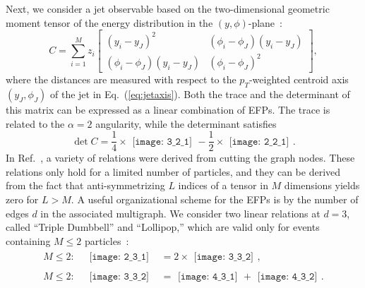 \documentclass[aps,prd,twocolumn, superscriptaddress,preprintnumbers, nofootinbib,longbibliography,floatfix]{revtex4-2}
\DeclareRobustCommand{\Eq}[1]{Eq.~(\ref{#1})}
\DeclareRobustCommand{\Ref}[1]{Ref.~\cite{#1}}
\begin{document}
Next, we consider a jet observable based on the two-dimensional geometric moment tensor of the energy distribution in the $(y,\phi)$-plane~\cite{Gur-Ari:2011cjr,Gallicchio:2012ez}:
%
\begin{equation}
	C = \sum_{i = 1}^M z_i
	\begin{bmatrix}
		(y_i - y_J)^2 & (\phi_i - \phi_J)(y_i - y_J) \\
		(\phi_i - \phi_J)(y_i - y_J) & (\phi_i - \phi_J)^2
	\end{bmatrix},
	\label{eq:C}
\end{equation}
%
where the distances are measured with respect to the $p_T$-weighted centroid axis $(y_J,\phi_J)$ of the jet in \Eq{eq:jetaxis}.
%
Both the trace and the determinant of this matrix can be expressed as a linear combination of EFPs.
%
The trace is related to the $\alpha = 2$ angularity, while the determinant satisfies~\cite{Komiske:2017aww}
%
\begin{equation}
\det C = \frac{1}{4} \times
\begin{gathered}
\texttt{[image: 3\_2\_1]}
\end{gathered}
- \frac{1}{2} \times
\begin{gathered}
\texttt{[image: 2\_2\_1]}
\end{gathered}.
\label{eq:detC}
\end{equation}
%
In \Ref{Komiske:2019asc}, a variety of relations were derived from cutting the graph nodes.
%
These relations only hold for a limited number of particles, and they can be derived from the fact that anti-symmetrizing $L$ indices of a tensor in $M$ dimensions yields zero for $L > M$.
%
A useful organizational scheme for the EFPs is by the number of edges $d$ in the associated multigraph.
%
We consider two linear relations at $d=3$, called ``Triple Dumbbell'' and ``Lollipop,'' which are valid only for events containing $M \leq 2$ particles~\cite{Komiske:2019asc}:
%
\begin{align}
M \leq 2: \quad
\begin{gathered}
\texttt{[image: 2\_3\_1]}
\end{gathered}
& = 2 \times
\begin{gathered}
\texttt{[image: 3\_3\_2]}
\end{gathered},\label{eq:dumbbell_relation}
\\
M \leq 2: \quad
\begin{gathered}
\texttt{[image: 3\_3\_2]}
\end{gathered}
&= 
\begin{gathered}
\texttt{[image: 4\_3\_1]}
\end{gathered}
+ 
\begin{gathered}
\texttt{[image: 4\_3\_2]}
\end{gathered}.
\label{eq:lollipop_relation}
\end{align}
\end{document}
